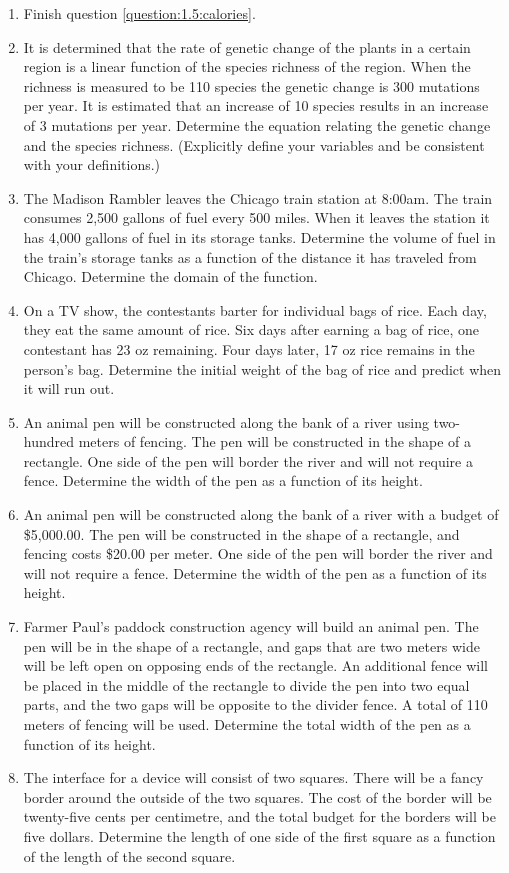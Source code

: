\begin{enumerate}
\item Finish question \ref{question:1.5:calories}.
\item It is determined that the rate of genetic change of the plants
  in a certain region is a linear function of the species richness of
  the region. When the richness is measured to be 110 species the
  genetic change is 300 mutations per year. It is estimated that an
  increase of 10 species results in an increase of 3 mutations per
  year. Determine the equation relating the genetic change and the
  species richness. (Explicitly define your variables and be
  consistent with your definitions.)
\item The Madison Rambler leaves the Chicago train station at
  8:00am. The train consumes 2,500 gallons of fuel every 500
  miles. When it leaves the station it has 4,000 gallons of fuel in
  its storage tanks. Determine the volume of fuel in the train's
  storage tanks as a function of the distance it has traveled from
  Chicago. Determine the domain of the function.
\item On a TV show, the contestants barter for individual bags of
  rice. Each day, they eat the same amount of rice. Six days after
  earning a bag of rice, one contestant has 23 oz remaining. Four days
  later, 17 oz rice remains in the person's bag. Determine the initial
  weight of the bag of rice and predict when it will run out.
\item An animal pen will be constructed along the bank of a river
  using two-hundred meters of fencing. The pen will be constructed in
  the shape of a rectangle. One side of the pen will border the river
  and will not require a fence. Determine the width of the pen as a
  function of its height.
\item An animal pen will be constructed along the bank of a river with
  a budget of \$5,000.00. The pen will be constructed in the shape of
  a rectangle, and fencing costs \$20.00 per meter. One side of the pen
  will border the river and will not require a fence. Determine the
  width of the pen as a function of its height.
\item Farmer Paul's paddock construction agency will build an animal
  pen. The pen will be in the shape of a rectangle, and gaps that are
  two meters wide will be left open on opposing ends of the
  rectangle. An additional fence will be placed in the middle of the
  rectangle to divide the pen into two equal parts, and the two gaps
  will be opposite to the divider fence. A total of 110 meters of
  fencing will be used. Determine the total width of the pen as a
  function of its height.
\item The interface for a device will consist of two squares.  There
  will be a fancy border around the outside of the two squares. The
  cost of the border will be twenty-five cents per centimetre, and the
  total budget for the borders will be five dollars. Determine the
  length of one side of the first square as a function of the length
  of the second square.
\end{enumerate}
